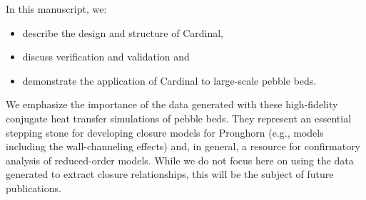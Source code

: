In this manuscript, we:

\begin{itemize}
\item describe the design and structure of Cardinal,
\item discuss verification and validation and
\item demonstrate the application of Cardinal to large-scale pebble beds.
\end{itemize}

We emphasize the importance of the data generated with these high-fidelity conjugate heat transfer simulations of pebble beds. They represent an essential stepping stone for developing closure models for Pronghorn (e.g., models including the wall-channeling effects) and, in general, a resource for confirmatory analysis of reduced-order models. While we do not focus here on using the data generated to extract closure relationships, this will be the subject of future publications.
